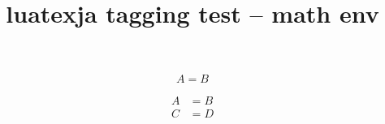 \documentclass{article}
\title{luatexja tagging test -- math env}
\begin{document}
\begin{equation}
A=B
\end{equation}

\begin{align}
A &= B\\
C &= D
\end{align}
\end{document}
